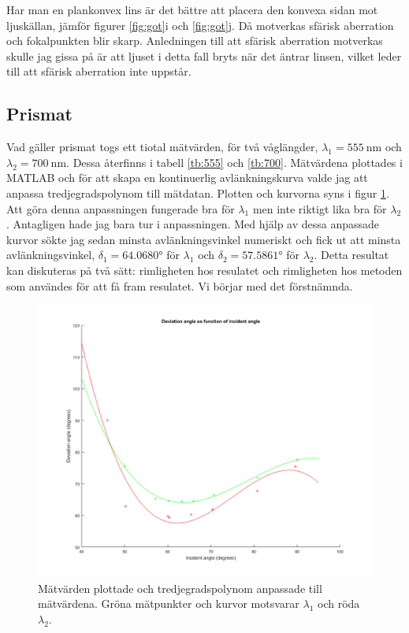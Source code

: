 \documentclass[a4paper]{article}
\begin{document}
Har man en plankonvex lins är det bättre att placera den konvexa sidan mot ljuskällan, jämför figurer \ref{fig:got}i och \ref{fig:got}j. Då motverkas
sfärisk aberration och fokalpunkten blir skarp. Anledningen till att sfärisk aberration motverkas skulle jag gissa på är att ljuset i detta fall bryts 
när det äntrar linsen, vilket leder till att sfärisk aberration inte uppstår.

\subsection{Prismat}
Vad gäller prismat togs ett tiotal mätvärden, för två våglängder, $\lambda_1=\SI{555}{\nano\meter}$ och $\lambda_2=\SI{700}{\nano\meter}$.
Dessa återfinns i tabell \ref{tb:555} och \ref{tb:700}. Mätvärdena plottades i MATLAB och för att skapa en kontinuerlig avlänkningskurva
valde jag att anpassa tredjegradspolynom till mätdatan. Plotten och kurvorna syns i figur \ref{fig: plot}. Att göra denna anpassningen
fungerade bra för $\lambda_1$ men inte riktigt lika bra för $\lambda_2$. Antagligen hade jag bara tur i anpassningen. Med hjälp av dessa
anpassade kurvor sökte jag sedan minsta avlänkningsvinkel numeriskt och fick ut att minsta avlänkningsvinkel, $\delta_1 = \ang{64.0680}$
för $\lambda_1$ och $\delta_2 = \ang{57.5861}$ för $\lambda_2$. Detta resultat kan diskuteras på två sätt: rimligheten hos resulatet och
rimligheten hos metoden som användes för att få fram resulatet. Vi börjar med det förstnämnda.

\begin{figure}[h]
    \centering
    \includegraphics[width=\textwidth]{graph}
    \caption{Mätvärden plottade och tredjegradspolynom anpassade till mätvärdena. Gröna mätpunkter och kurvor motsvarar $\lambda_1$ och röda $\lambda_2$.}
    \label{fig: plot}
\end{figure}
\end{document}
